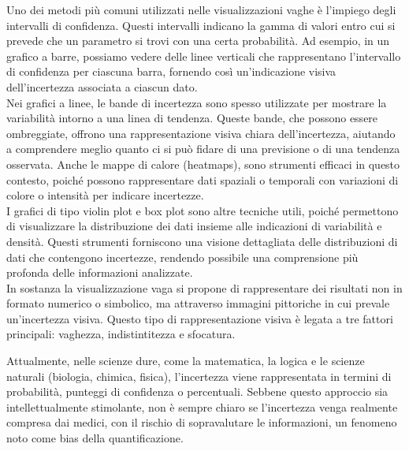 Uno dei metodi più comuni utilizzati nelle visualizzazioni vaghe è l'impiego degli intervalli di confidenza. Questi intervalli indicano la gamma di valori entro cui si prevede che un parametro si trovi con una certa probabilità. Ad esempio, in un grafico a barre, possiamo vedere delle linee verticali che rappresentano l'intervallo di confidenza per ciascuna barra, fornendo così un'indicazione visiva dell'incertezza associata a ciascun dato.\\
Nei grafici a linee, le bande di incertezza sono spesso utilizzate per mostrare la variabilità intorno a una linea di tendenza. Queste bande, che possono essere ombreggiate, offrono una rappresentazione visiva chiara dell'incertezza, aiutando a comprendere meglio quanto ci si può fidare di una previsione o di una tendenza osservata. Anche le mappe di calore (heatmaps), sono strumenti efficaci in questo contesto, poiché possono rappresentare dati spaziali o temporali con variazioni di colore o intensità per indicare incertezze.\\
I grafici di tipo violin plot e box plot sono altre tecniche utili, poiché permettono di visualizzare la distribuzione dei dati insieme alle indicazioni di variabilità e densità. Questi strumenti forniscono una visione dettagliata delle distribuzioni di dati che contengono incertezze, rendendo possibile una comprensione più profonda delle informazioni analizzate.\\

In sostanza la visualizzazione vaga si propone di rappresentare dei risultati non in formato numerico o simbolico, ma attraverso immagini pittoriche in cui prevale un'incertezza visiva. Questo tipo di rappresentazione visiva è legata a tre fattori principali: vaghezza, indistintitezza e sfocatura.

Attualmente, nelle scienze dure, come la matematica, la logica e le scienze naturali (biologia, chimica, fisica), l'incertezza viene rappresentata in termini di probabilità, punteggi di confidenza o percentuali. Sebbene questo approccio sia intellettualmente stimolante, non è sempre chiaro se l'incertezza venga realmente compresa dai medici, con il rischio di sopravalutare le informazioni, un fenomeno noto come bias della quantificazione.\\

